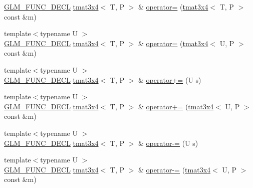 \begin{DoxyCompactItemize}
\item 
\hyperlink{setup_8hpp_ab2d052de21a70539923e9bcbf6e83a51}{G\+L\+M\+\_\+\+F\+U\+N\+C\+\_\+\+D\+E\+CL} \hyperlink{structglm_1_1detail_1_1tmat3x4}{tmat3x4}$<$ T, P $>$ \& \hyperlink{structglm_1_1detail_1_1tmat3x4_a235b6fc15047de1d9415b3e1027bc2e4}{operator=} (\hyperlink{structglm_1_1detail_1_1tmat3x4}{tmat3x4}$<$ T, P $>$ const \&m)
\item 
{\footnotesize template$<$typename U $>$ }\\\hyperlink{setup_8hpp_ab2d052de21a70539923e9bcbf6e83a51}{G\+L\+M\+\_\+\+F\+U\+N\+C\+\_\+\+D\+E\+CL} \hyperlink{structglm_1_1detail_1_1tmat3x4}{tmat3x4}$<$ T, P $>$ \& \hyperlink{structglm_1_1detail_1_1tmat3x4_a3e6b142f80982e1d1722f75a6d146090}{operator=} (\hyperlink{structglm_1_1detail_1_1tmat3x4}{tmat3x4}$<$ U, P $>$ const \&m)
\item 
{\footnotesize template$<$typename U $>$ }\\\hyperlink{setup_8hpp_ab2d052de21a70539923e9bcbf6e83a51}{G\+L\+M\+\_\+\+F\+U\+N\+C\+\_\+\+D\+E\+CL} \hyperlink{structglm_1_1detail_1_1tmat3x4}{tmat3x4}$<$ T, P $>$ \& \hyperlink{structglm_1_1detail_1_1tmat3x4_ab57d6efb45e4b2e6fd77a12486c4daa8}{operator+=} (U s)
\item 
{\footnotesize template$<$typename U $>$ }\\\hyperlink{setup_8hpp_ab2d052de21a70539923e9bcbf6e83a51}{G\+L\+M\+\_\+\+F\+U\+N\+C\+\_\+\+D\+E\+CL} \hyperlink{structglm_1_1detail_1_1tmat3x4}{tmat3x4}$<$ T, P $>$ \& \hyperlink{structglm_1_1detail_1_1tmat3x4_ac18c19db6f4e348c972e9f937522eaca}{operator+=} (\hyperlink{structglm_1_1detail_1_1tmat3x4}{tmat3x4}$<$ U, P $>$ const \&m)
\item 
{\footnotesize template$<$typename U $>$ }\\\hyperlink{setup_8hpp_ab2d052de21a70539923e9bcbf6e83a51}{G\+L\+M\+\_\+\+F\+U\+N\+C\+\_\+\+D\+E\+CL} \hyperlink{structglm_1_1detail_1_1tmat3x4}{tmat3x4}$<$ T, P $>$ \& \hyperlink{structglm_1_1detail_1_1tmat3x4_a9bfae7f6a40560de9392ba57cd2edff5}{operator-\/=} (U s)
\item 
{\footnotesize template$<$typename U $>$ }\\\hyperlink{setup_8hpp_ab2d052de21a70539923e9bcbf6e83a51}{G\+L\+M\+\_\+\+F\+U\+N\+C\+\_\+\+D\+E\+CL} \hyperlink{structglm_1_1detail_1_1tmat3x4}{tmat3x4}$<$ T, P $>$ \& \hyperlink{structglm_1_1detail_1_1tmat3x4_aa8d0e590eec95fd09194f038dd349e34}{operator-\/=} (\hyperlink{structglm_1_1detail_1_1tmat3x4}{tmat3x4}$<$ U, P $>$ const \&m)
\item 

\end{DoxyCompactItemize}
